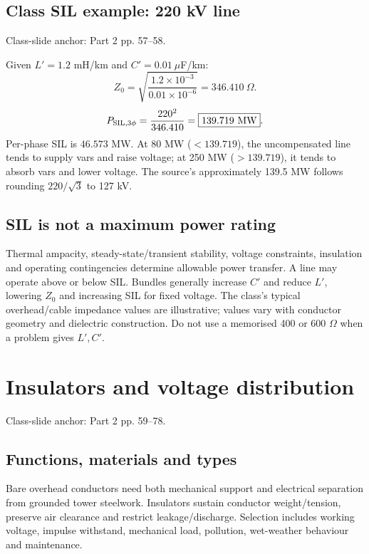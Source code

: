 \documentclass[11pt,a4paper]{article}
\newcommand{\slides}[1]{{\small\color{muted}\textsf{Class-slide anchor: #1.}}\par}
\newcommand{\chapterstart}[2]{\clearpage\section{#1}\label{#2}}
\newcommand{\ans}[1]{\boxed{#1}}
\begin{document}
\subsection{Class SIL example: 220 kV line}
\slides{Part 2 pp. 57--58}
Given $L'=1.2$ mH/km and $C'=0.01\ \mu$F/km:
\[
 Z_0=\sqrt{\frac{1.2\times10^{-3}}{0.01\times10^{-6}}}
 =\ans{346.410\ \Omega}.
\]
\[
 P_{\rm SIL,3\phi}=\frac{220^2}{346.410}=\ans{139.719\ \mathrm{MW}}.
\]
Per-phase SIL is $46.573$ MW. At 80 MW ($<139.719$), the uncompensated line tends to supply vars and raise voltage; at 250 MW ($>139.719$), it tends to absorb vars and lower voltage. The source's approximately 139.5 MW follows rounding $220/\sqrt3$ to 127 kV.
\subsection{SIL is not a maximum power rating}
Thermal ampacity, steady-state/transient stability, voltage constraints, insulation and operating contingencies determine allowable power transfer. A line may operate above or below SIL. Bundles generally increase $C'$ and reduce $L'$, lowering $Z_0$ and increasing SIL for fixed voltage. The class's typical overhead/cable impedance values are illustrative; values vary with conductor geometry and dielectric construction. Do not use a memorised 400 or 600 $\Omega$ when a problem gives $L',C'$.

\chapterstart{Insulators and voltage distribution}{insulators}
\slides{Part 2 pp. 59--78}
\subsection{Functions, materials and types}
Bare overhead conductors need both mechanical support and electrical separation from grounded tower steelwork. Insulators sustain conductor weight/tension, preserve air clearance and restrict leakage/discharge. Selection includes working voltage, impulse withstand, mechanical load, pollution, wet-weather behaviour and maintenance.
\end{document}
